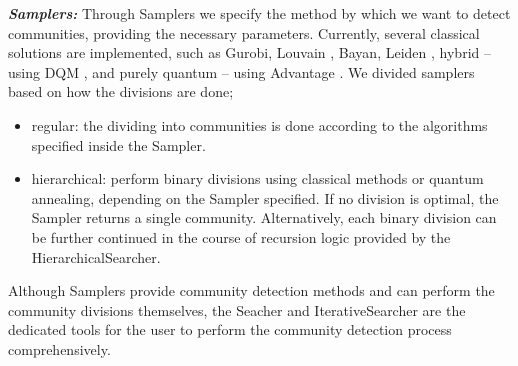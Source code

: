 \documentclass[pdflatex,sn-mathphys-num]{sn-jnl}%
\begin{document}
\textit{\textbf{Samplers:}} Through Samplers we specify the method by which we want to detect communities, providing the necessary parameters. Currently, several classical solutions are implemented, such as Gurobi, Louvain \cite{Blondel2008}, Bayan\cite{aref2023}, Leiden \cite{Traag2019}, hybrid -- using DQM \cite{Wierzbinski2023}, and purely quantum -- using Advantage \cite{Johnson2011,lamza_qhyper_2024}. We divided samplers based on how the divisions are done;
\begin{itemize} 
\item regular: the dividing into communities is done according to the algorithms specified inside the Sampler.\item hierarchical: perform binary divisions using classical methods or quantum annealing, depending on the Sampler specified. If no division is optimal, the Sampler returns a single community. Alternatively, each binary division can be further continued in the course of recursion logic provided by the HierarchicalSearcher.
\end{itemize}

Although Samplers provide community detection methods and can perform the community divisions themselves, the Seacher and IterativeSearcher are the dedicated tools for the user to perform the community detection process comprehensively. 
\end{document}
